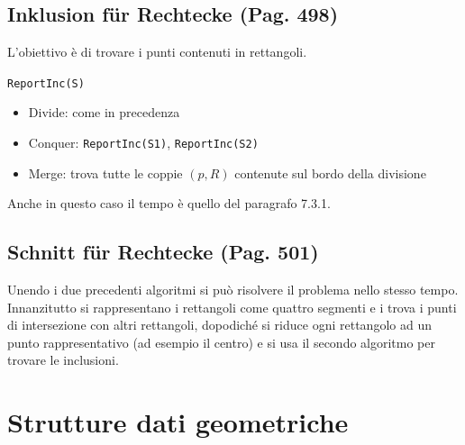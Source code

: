 \documentclass[a4paper]{book}
\newcommand{\inline}[1]{\lstinline!#1!}%
\begin{document}
\subsection{Inklusion für Rechtecke (Pag. 498)}
L'obiettivo è di trovare i punti contenuti in rettangoli.

\inline{ReportInc(S)}%
\begin{itemize}
\item Divide: come in precedenza
\item Conquer: \inline{ReportInc(S1)}, \inline{ReportInc(S2)}
\item Merge: trova tutte le coppie $(p,R)$ contenute sul bordo della divisione
\end{itemize}
Anche in questo caso il tempo è quello del paragrafo 7.3.1.
\subsection{Schnitt für Rechtecke (Pag. 501)}
Unendo i due precedenti algoritmi si può risolvere il problema nello stesso tempo. Innanzitutto si rappresentano i rettangoli come quattro segmenti e i trova i punti di intersezione con altri rettangoli, dopodiché si riduce ogni rettangolo ad un punto rappresentativo (ad esempio il centro) e si usa il secondo algoritmo per trovare le inclusioni.

\section{Strutture dati geometriche}
\end{document}
